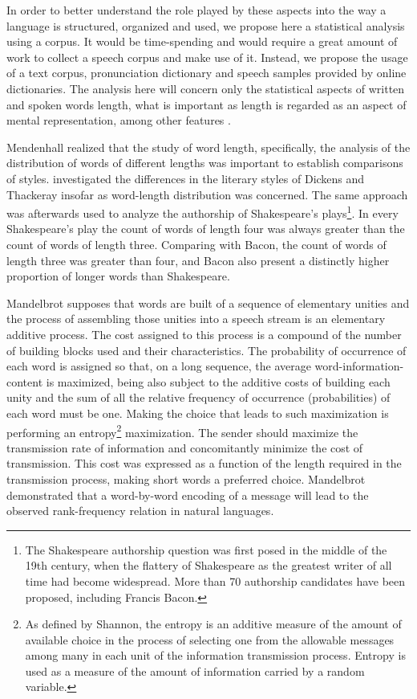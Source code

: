 In order to better understand the role played by these aspects into the way a language is
structured, organized and used, we propose here a statistical analysis using a corpus. 
It would be time-spending and would require a great amount of work to collect a speech corpus
and make use of it. Instead, we propose the usage of a text corpus, pronunciation dictionary
and speech samples provided by online dictionaries.
The analysis here will concern only the statistical aspects of written and spoken words length,
what is important as length is regarded as an aspect of mental representation, 
among other features \citep{port2007}.

Mendenhall realized that the study of word length, specifically, the analysis of the distribution
of words of different lengths was important to establish comparisons of styles. \cite{mendenhall1887}
investigated the differences in the literary 
styles of Dickens and Thackeray insofar as word-length distribution was concerned. The same approach
was afterwards used \citep{mendenhall1901} to analyze the authorship of Shakespeare's plays\footnote{
The Shakespeare authorship question was first posed in the middle of the 19th century,
when the flattery of Shakespeare as the greatest writer of all time had become widespread.
More than 70 authorship candidates have been proposed, including Francis Bacon.}.
In every Shakespeare's play the count of words of length four was always greater than the count of
words of length three. Comparing with Bacon, the count of words of length three was greater than four, and
Bacon also present a distinctly higher proportion of longer words than Shakespeare.

Mandelbrot \citep{mandelbrot} supposes that words are built of a sequence of elementary unities and the process of 
assembling those unities into a speech stream is an elementary additive process. The cost
assigned to this process is a compound of the number of building blocks used and their characteristics.
The probability of occurrence 
of each word is assigned so that, on a long sequence, the average word-information-content
is maximized, being also subject to the additive costs of building each unity and the sum of
all the relative frequency of occurrence (probabilities) of each word must be one. Making the choice
that leads to such maximization is performing an entropy\footnote{As defined by Shannon, 
the entropy is an additive measure of the amount of available choice 
in the process of selecting one from the allowable messages among many in each unit of
the information transmission process. Entropy is used as a measure of the amount of information
carried by a random variable.} maximization.
The sender should maximize the transmission rate of information and concomitantly minimize
the cost of transmission. This cost was expressed as a function of the length required in the transmission
process, making short words a preferred choice. Mandelbrot demonstrated that a word-by-word encoding
of a message will lead to the observed rank-frequency relation in natural languages.

